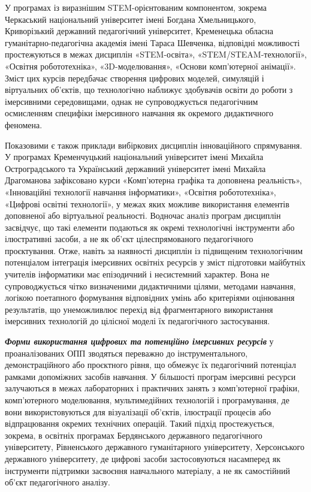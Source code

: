 У програмах із виразнішим STEM-орієнтованим компонентом, зокрема Черкаський національний університет імені Богдана Хмельницького, Криворізький державний педагогічний університет, Кременецька обласна гуманітарно-педагогічна академія імені Тараса Шевченка, відповідні можливості простежуються в межах дисциплін «STEM-освіта», «STEM/STEAM-технології», «Освітня робототехніка», «3D-моделювання», «Основи комп'ютерної анімації». Зміст цих курсів передбачає створення цифрових моделей, симуляцій і віртуальних об'єктів, що технологічно наближує здобувачів освіти до роботи з імерсивними середовищами, однак не супроводжується педагогічним осмисленням специфіки імерсивного навчання як окремого дидактичного феномена.

Показовими є також приклади вибіркових дисциплін інноваційного спрямування. У програмах Кременчуцький національний університет імені Михайла Остроградського та Український державний університет імені Михайла Драгоманова зафіксовано курси «Комп'ютерна графіка та доповнена реальність», «Інноваційні технології навчання інформатики», «Освітня робототехніка», «Цифрові освітні технології», у межах яких можливе використання елементів доповненої або віртуальної реальності. Водночас аналіз програм дисциплін засвідчує, що такі елементи подаються як окремі технологічні інструменти або ілюстративні засоби, а не як об'єкт цілеспрямованого педагогічного проєктування. Отже, навіть за наявності дисциплін із підвищеним технологічним потенціалом інтеграція імерсивних освітніх ресурсів у зміст підготовки майбутніх учителів інформатики має епізодичний і несистемний характер. Вона не супроводжується чітко визначеними дидактичними цілями, методами навчання, логікою поетапного формування відповідних умінь або критеріями оцінювання результатів, що унеможливлює перехід від фрагментарного використання імерсивних технологій до цілісної моделі їх педагогічного застосування.

\emph{\textbf{Форми використання цифрових та потенційно імерсивних ресурсів}} у проаналізованих ОПП зводяться переважно до інструментального, демонстраційного або проєктного рівня, що обмежує їх педагогічний потенціал рамками допоміжних засобів навчання. У більшості програм імерсивні ресурси залучаються в межах лабораторних і практичних занять з комп'ютерної графіки, комп'ютерного моделювання, мультимедійних технологій і програмування, де вони використовуються для візуалізації об'єктів, ілюстрації процесів або відпрацювання окремих технічних операцій. Такий підхід простежується, зокрема, в освітніх програмах Бердянського державного педагогічного університету, Рівненського державного гуманітарного університету, Херсонського державного університету, де цифрові засоби застосовуються насамперед як інструменти підтримки засвоєння навчального матеріалу, а не як самостійний об'єкт педагогічного аналізу.

